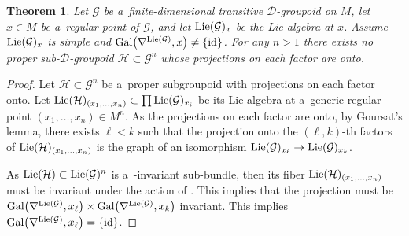 \documentclass[10pt,a4paper]{amsart}
\numberwithin{equation}{section}
\newtheorem{Theorem}{Theorem}[section]
\theoremstyle{definition}
\begin{document}
\begin{Theorem}\label{thm:7}
 Let $\mathcal G$ be a~finite-dimensional transitive $\mathcal D$-groupoid on $M$, let $x\in M$ be a~regular point of $\mathcal G$, and let ${\rm Lie}(\mathcal G)_x$ be the Lie algebra at $x$. Assume ${\rm Lie}(\mathcal G)_x$ is simple and ${\rm Gal}\bigl(\nabla^{{\rm Lie}(\mathcal G)}, x\bigr) \not = \{ {\rm id} \}$.
 For any $n >1$ there exists no proper sub-$\mathcal D$-groupoid $\mathcal H \subset \mathcal G^n$ whose projections on each factor are onto.
\end{Theorem}


\begin{proof}
Let $\mathcal H \subset \mathcal G^n$ be a~proper subgroupoid with projections on each factor onto. Let ${\rm Lie}(\mathcal H)_{(x_1,\dots,x_n)} \subset \prod \mathfrak {\rm Lie}(\mathcal G)_{x_i}$ be its Lie algebra at a~generic regular point $(x_1,\dots, x_n) \in M^n$. As the projections on each factor are onto, by Goursat's lemma, there exists $\ell<k$ such that the projection onto the $(\ell,k)$-th factors of ${\rm Lie}(\mathcal H)_{(x_1,\dots,x_n)}$ is the graph of an isomorphism ${\rm Lie}(\mathcal G)_{x_\ell} \to {\rm Lie}(\mathcal G)_{x_k}$.

As ${\rm Lie}(\mathcal H) \subset {\rm Lie}(\mathcal G)^n$ is a~-invariant sub-bundle, then its fiber ${\rm Lie}(\mathcal H)_{(x_1,\dots,x_n)}$ must be invariant under the action of . This implies that the projection must be ${\rm Gal}\bigl(\nabla^{{\rm Lie}(\mathcal G)},x_\ell\bigr) \times {\rm Gal}\bigl(\nabla^{{\rm Lie}(\mathcal G)}, x_k\bigr)$ invariant. This implies ${\rm Gal}\bigl(\nabla^{{\rm Lie}(\mathcal G)}, x_\ell\bigr) = \{{\rm id}\}$.
\end{proof}
\end{document}
